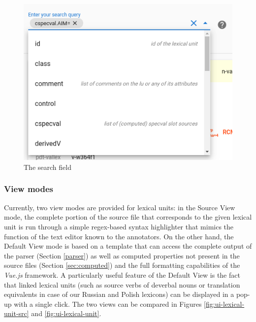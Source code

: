 \documentclass[10pt, a4paper]{article}
\begin{document}
\begin{figure}
    \includegraphics[width=\hsize]{images/ui-search.png}
    \caption{\label{fig:ui-search}The search field}
\end{figure}

\subsubsection{View modes}
Currently, two view modes are provided for lexical units:
in the Source View mode, the complete portion of the source file that corresponds to the given lexical unit is run through a simple regex-based syntax highlighter that mimics the function of the text editor known to the annotators.
On the other hand, the Default View mode is based on a template that can access the complete output of the parser (Section \ref{parser})
as well as computed properties not present in the source files (Section \ref{sec:computed})
and the full formatting capabilities of the \emph{Vue.js} framework.
A particularly useful feature of the Default View is the fact that linked lexical units
(such as source verbs of deverbal nouns or translation equivalents in case of our Russian and Polish lexicons)
can be displayed in a pop-up with a single click.
The two views can be compared in Figures \ref{fig:ui-lexical-unit-src} and \ref{fig:ui-lexical-unit}.
\end{document}
